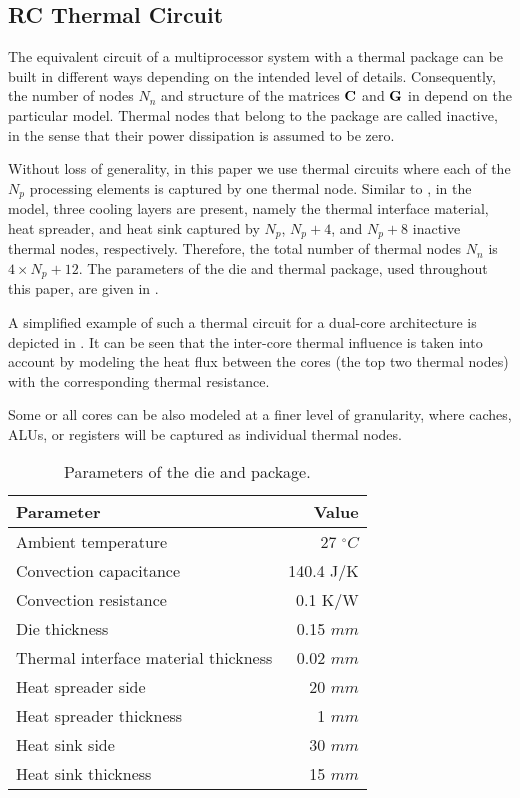 \subsection{RC Thermal Circuit} 

The equivalent circuit of a multiprocessor system with a thermal package can be
built in different ways depending on the intended level of details.
Consequently, the number of nodes $N_n$ and structure of the matrices $\mathbf{C}$
and $\mathbf{G}$ in  depend on the particular model. Thermal
nodes that belong to the package are called inactive, in the sense that their
power dissipation is assumed to be zero.

Without loss of generality, in this paper we use thermal circuits where each of
the $N_p$ processing elements is captured by one thermal node. Similar to
\cite{huang2003}, in the model, three cooling layers are present, namely the
thermal interface material, heat spreader, and heat sink captured by $N_p$, $N_p
+ 4$, and $N_p + 8$ inactive thermal nodes, respectively. Therefore, the total
number of thermal nodes $N_n$ is $4 \times N_p + 12$. The parameters of the die
and thermal package, used throughout this paper, are given in .

A simplified example of such a thermal circuit for a dual-core architecture is
depicted in . It can be seen that the inter-core thermal influence
is taken into account by modeling the heat flux between the cores (the top two
thermal nodes) with the corresponding thermal resistance.

Some or all cores can be also modeled at a finer level of granularity, where
caches, ALUs, or registers will be captured as individual thermal nodes.
\begin{table}[b]
  \vspace{15pt}
  \caption{Parameters of the die and package.}
  \centering
  \begin{tabular}{|l|r|}
    \hline
    Parameter & Value \\
    \hline
    \hline
    Ambient temperature                   &   27 ${}^\circ C$ \\
    Convection capacitance                & 140.4 J/K \\
    Convection resistance                 & 0.1 K/W \\
    Die thickness                         & 0.15 $mm$ \\
    Thermal interface material thickness  & 0.02 $mm$ \\
    Heat spreader side                    &   20 $mm$ \\
    Heat spreader thickness               &    1 $mm$ \\
    Heat sink side                        &   30 $mm$ \\
    Heat sink thickness                   &   15 $mm$ \\
    \hline
  \end{tabular}
\end{table}


